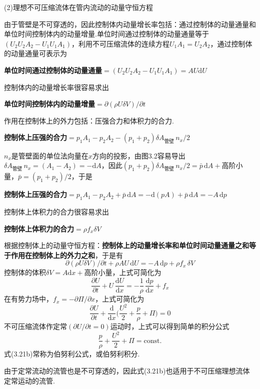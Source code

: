 (2)理想不可压缩流体在管内流动的动量守恒方程

由于管壁是不可穿透的，因此控制体内动量增长率包括：通过控制体的动量通量和单位时间控制体内的动量增量.单位时间通过控制体的动量通量等于$(U_2U_2A_2-U_1U_1A_1)$，利用不可压缩流体的连续方程$U_1A_1=U_2A_2$，通过控制体的动量通量可表示为

\textbf{单位时间通过控制体的动量通量}$=(U_2U_2A_2-U_1U_1A_1)=AU\mathrm{d}U$

控制体内的动量增长率很容易求出

\textbf{单位时间控制体内的动量增量}$=\partial(\rho U\delta V)/\partial t$

作用在控制体上的外力包括：压强合力和体积力的合力.

\textbf{控制体上压强的合力}$=p_1A_1-p_2A_2-(p_1+p_2)\delta A_{\text{管壁}}\,n_x/2$

$n_x$是管壁面的单位法向量在$x$方向的投影，由图3.2容易导出$\delta A_{\text{管壁}}\,n_x=(A_1-A_2)=-\mathrm{d}A$，因此$(p_1+p_2)\delta A_{\text{管壁}}\,n_x/2=\bar{p}\,\mathrm{d}A+$高阶小量，$\bar{p}=(p_1+p_2)/2$，于是

\textbf{控制体上压强的合力}$=p_1A_1-p_2A_2+\bar{p}\,\mathrm{d}A=-\mathrm{d}(pA)+\bar{p}\,\mathrm{d}A=-A\,\mathrm{d}p$

控制体上体积力的合力很容易求出

\textbf{控制体上体积力的合力}$=\rho f_x\delta V$

根据控制体上的动量守恒方程：\textbf{控制体上的动量增长率和单位时间动量通量之和等于作用在控制体上的外力之和}，于是有
\[
\partial(\rho U\delta V)/\partial t+\rho A U\,\mathrm{d}U=-A\,\mathrm{d}p+\rho f_x\,\delta V
\]
控制体的体积$\delta V=A\mathrm{d}x+$高阶小量，上式可简化为
\begin{equation*}
\frac{\partial U}{\partial t}+U\,\frac{\mathrm{d}U}{\mathrm{d}x}=-\frac{1}{\rho}\,\frac{\mathrm{d}p}{\mathrm{d}x}+f_x
\tag{3.20}
\end{equation*}
在有势力场中，$f_x=-\partial\Pi/\partial x$，上式可简化为
\begin{equation*}
\frac{\partial U}{\partial t}+\frac{\mathrm{d}}{\mathrm{d}x}\Big(\frac{U^{2}}{2}+\frac{p}{\rho}+\Pi\Big)=0
\tag{3.21a}
\end{equation*}
不可压缩流体作定常$(\partial U/\partial t=0)$运动时，上式可以得到简单的积分公式
\begin{equation*}
\frac{p}{\rho}+\frac{U^{2}}{2}+\Pi=\mathrm{const.}
\tag{3.21b}
\end{equation*}
式(3.21b)常称为伯努利公式，或伯努利积分.

由于定常流动的流管也是不可穿透的，因此式(3.21b)也适用于不可压缩理想流体定常运动的流管.


